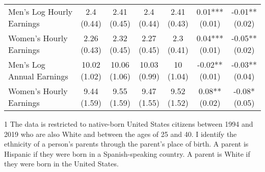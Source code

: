 \begin{table}[!h]
{\begin{threeparttable}
\begin{tabular}[t]{lcccccc}
\addlinespace
\hspace{1em}Men’s Log Hourly Earnings & \specialcell{2.4\\(0.44)} & \specialcell{2.41\\(0.45)} & \specialcell{2.4\\(0.44)} & \specialcell{2.41\\(0.43)} & \specialcell{0.01***\\(0.01)} & \specialcell{-0.01**\\(0.02)}\\
\hspace{1em}Women’s Hourly Earnings & \specialcell{2.26\\(0.43)} & \specialcell{2.32\\(0.45)} & \specialcell{2.27\\(0.45)} & \specialcell{2.3\\(0.41)} & \specialcell{0.04***\\(0.01)} & \specialcell{-0.05**\\(0.02)}\\
\hspace{1em}Men’s Log Annual Earnings & \specialcell{10.02\\(1.02)} & \specialcell{10.06\\(1.06)} & \specialcell{10.03\\(0.99)} & \specialcell{10\\(1.04)} & \specialcell{-0.02**\\(0.01)} & \specialcell{-0.03**\\(0.04)}\\
\hspace{1em}Women’s Hourly Earnings & \specialcell{9.44\\(1.59)} & \specialcell{9.55\\(1.59)} & \specialcell{9.47\\(1.55)} & \specialcell{9.52\\(1.52)} & \specialcell{0.08**\\(0.02)} & \specialcell{-0.08*\\(0.05)}\\
\bottomrule
\end{tabular}
\begin{tablenotes}
\item[1] The data is restricted to native-born United States citizens between 1994 and 2019 who are also White and between the ages of 25 and 40. I identify the ethnicity of a person's parents through the parent's place of birth. A parent is Hispanic if they were born in a Spanish-speaking country. A parent is White if they were born in the United States.

\end{tablenotes}
\end{threeparttable}}
\end{table}

